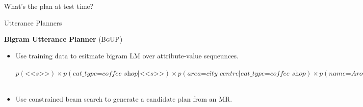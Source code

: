 \begin{frame}{What's the plan at test time?}
{
}
\end{frame}

\begin{frame}{Utterance Planners}

\textbf{Bigram Utterance Planner} (\textsc{BgUP})\\
\begin{itemize}
\item Use training data to esitmate bigram LM over attribute-value sequeunces.\\
~\\
$p(\textit{<<s>>})\times p(\textit{eat\_type=coffee shop}|\textit{<<s>>})\times p(\textit{area=city centre}|\textit{eat\_type=coffee shop})
\times p(\textit{name=Aromi}|\textit{area=city centre})\times
p(\textit{<<e>>}|\textit{name=Aromi})$\\~\\

\item Use constrained beam search to generate a candidate plan from an MR.
\end{itemize}
\end{frame}


